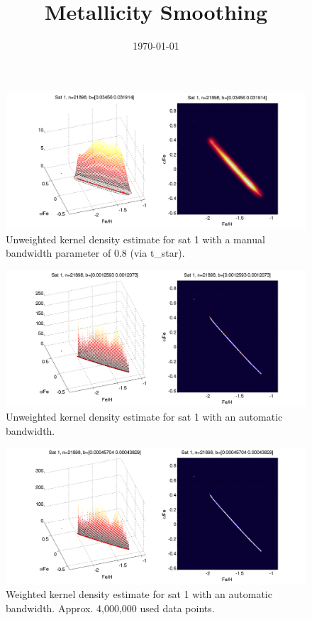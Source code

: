 \documentclass[landscape,12pt]{amsart}
\title{Metallicity Smoothing}
\author{\today}
\begin{document}
\maketitle





\begin{figure}
	\begin{center}
		\includegraphics[scale=.5]{smooth1_08.png}
	\end{center}
	\caption{Unweighted kernel density estimate for sat 1 with a manual bandwidth parameter of 0.8 (via t\_star).}
\end{figure}

\begin{figure}
	\begin{center}
		\includegraphics[scale=.5]{smooth1_auto.png}
	\end{center}
	\caption{Unweighted kernel density estimate for sat 1 with an automatic bandwidth.}
\end{figure}

\begin{figure}
	\begin{center}
		\includegraphics[scale=.5]{wsmooth1_auto_4m.png}
	\end{center}
	\caption{Weighted kernel density estimate for sat 1 with an automatic bandwidth. Approx. 4,000,000 used data points.}
\end{figure}
\end{document}
